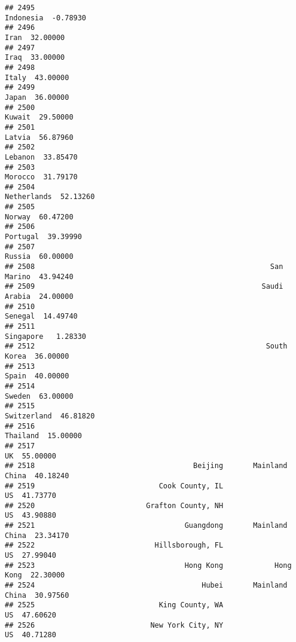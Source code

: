 \documentclass[
]{article}
\begin{document}
\begin{verbatim}
## 2495                                                        Indonesia  -0.78930
## 2496                                                             Iran  32.00000
## 2497                                                             Iraq  33.00000
## 2498                                                            Italy  43.00000
## 2499                                                            Japan  36.00000
## 2500                                                           Kuwait  29.50000
## 2501                                                           Latvia  56.87960
## 2502                                                          Lebanon  33.85470
## 2503                                                          Morocco  31.79170
## 2504                                                      Netherlands  52.13260
## 2505                                                           Norway  60.47200
## 2506                                                         Portugal  39.39990
## 2507                                                           Russia  60.00000
## 2508                                                       San Marino  43.94240
## 2509                                                     Saudi Arabia  24.00000
## 2510                                                          Senegal  14.49740
## 2511                                                        Singapore   1.28330
## 2512                                                      South Korea  36.00000
## 2513                                                            Spain  40.00000
## 2514                                                           Sweden  63.00000
## 2515                                                      Switzerland  46.81820
## 2516                                                         Thailand  15.00000
## 2517                                                               UK  55.00000
## 2518                                     Beijing       Mainland China  40.18240
## 2519                             Cook County, IL                   US  41.73770
## 2520                          Grafton County, NH                   US  43.90880
## 2521                                   Guangdong       Mainland China  23.34170
## 2522                            Hillsborough, FL                   US  27.99040
## 2523                                   Hong Kong            Hong Kong  22.30000
## 2524                                       Hubei       Mainland China  30.97560
## 2525                             King County, WA                   US  47.60620
## 2526                           New York City, NY                   US  40.71280

\end{verbatim}
\end{document}
